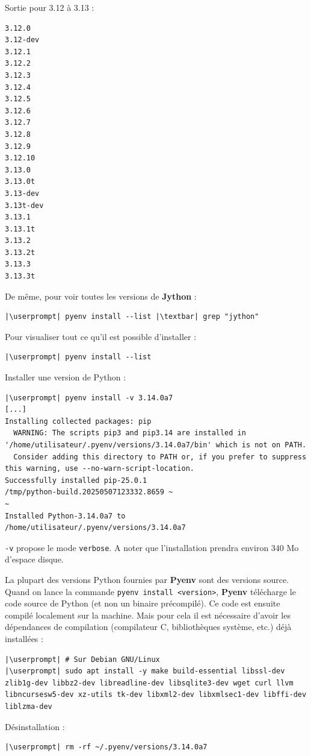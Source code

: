 Sortie pour 3.12 à 3.13 :
\begin{lstlisting}[style=visual]
3.12.0
3.12-dev
3.12.1
3.12.2
3.12.3
3.12.4
3.12.5
3.12.6
3.12.7
3.12.8
3.12.9
3.12.10
3.13.0
3.13.0t
3.13-dev
3.13t-dev
3.13.1
3.13.1t
3.13.2
3.13.2t
3.13.3
3.13.3t
\end{lstlisting}

De même, pour voir toutes les versions de \textbf{Jython} :
\begin{lstlisting}[style=bash]
|\userprompt| pyenv install --list |\textbar| grep "jython"
\end{lstlisting}

Pour visualiser tout ce qu'il est possible d'installer :
\begin{lstlisting}[style=bash]
|\userprompt| pyenv install --list
\end{lstlisting}

Installer une version de Python :
\begin{lstlisting}[style=bash]
|\userprompt| pyenv install -v 3.14.0a7
[...]
Installing collected packages: pip
  WARNING: The scripts pip3 and pip3.14 are installed in '/home/utilisateur/.pyenv/versions/3.14.0a7/bin' which is not on PATH.
  Consider adding this directory to PATH or, if you prefer to suppress this warning, use --no-warn-script-location.
Successfully installed pip-25.0.1
/tmp/python-build.20250507123332.8659 ~
~
Installed Python-3.14.0a7 to /home/utilisateur/.pyenv/versions/3.14.0a7
\end{lstlisting}

\texttt{-v} propose le mode \texttt{verbose}. A noter que l'installation prendra environ 340 Mo d'espace disque.

La plupart des versions Python fournies par \textbf{Pyenv} sont des versions source. Quand on lance la commande \texttt{pyenv install <version>}, \textbf{Pyenv} télécharge le code source de Python (et non un binaire précompilé). Ce code est ensuite compilé localement sur la machine. Mais pour cela il est nécessaire d'avoir les dépendances de compilation (compilateur C, bibliothèques système, etc.) déjà installées :
\begin{lstlisting}[style=bash]
|\userprompt| # Sur Debian GNU/Linux
|\userprompt| sudo apt install -y make build-essential libssl-dev zlib1g-dev libbz2-dev libreadline-dev libsqlite3-dev wget curl llvm libncursesw5-dev xz-utils tk-dev libxml2-dev libxmlsec1-dev libffi-dev liblzma-dev
\end{lstlisting}

Désinstallation :
\begin{lstlisting}[style=bash]
|\userprompt| rm -rf ~/.pyenv/versions/3.14.0a7
\end{lstlisting}

